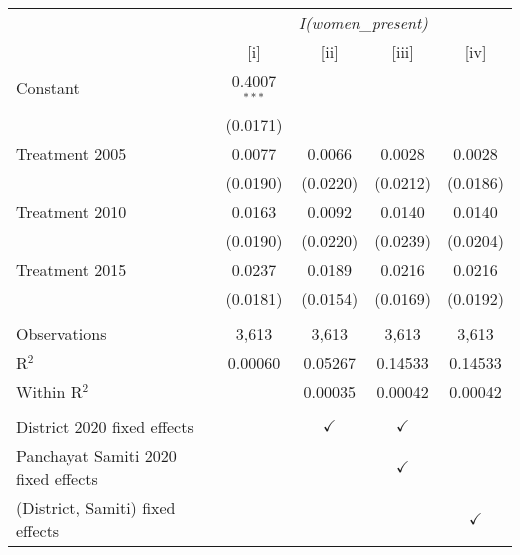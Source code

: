 
\begingroup
\centering
\begin{tabular}{lcccc}
   \toprule
    & \multicolumn{4}{c}{\textit{I(women\_present)}}\\
                                       & [i]            & [ii]          & [iii]         & [iv]\\  
   \midrule 
   Constant                            & 0.4007$^{***}$ &               &               &   \\   
                                       & (0.0171)       &               &               &   \\   
   Treatment 2005                      & 0.0077         & 0.0066        & 0.0028        & 0.0028\\   
                                       & (0.0190)       & (0.0220)      & (0.0212)      & (0.0186)\\   
   Treatment  2010                     & 0.0163         & 0.0092        & 0.0140        & 0.0140\\   
                                       & (0.0190)       & (0.0220)      & (0.0239)      & (0.0204)\\   
   Treatment 2015                      & 0.0237         & 0.0189        & 0.0216        & 0.0216\\   
                                       & (0.0181)       & (0.0154)      & (0.0169)      & (0.0192)\\   
    \\
   Observations                        & 3,613          & 3,613         & 3,613         & 3,613\\  
   R$^2$                               & 0.00060        & 0.05267       & 0.14533       & 0.14533\\  
   Within R$^2$                        &                & 0.00035       & 0.00042       & 0.00042\\  
    \\
   District 2020 fixed effects         &                & $\checkmark$  & $\checkmark$  & \\  
   Panchayat Samiti 2020 fixed effects &                &               & $\checkmark$  & \\  
   (District, Samiti) fixed effects    &                &               &               & $\checkmark$\\   
   \bottomrule
\end{tabular}
\par\endgroup


